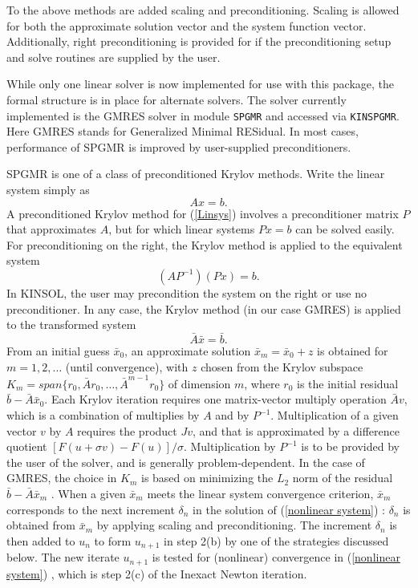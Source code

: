 To the above methods are added scaling and preconditioning. Scaling is allowed
for both the approximate solution vector and the system function vector. 
Additionally, right preconditioning is provided for if the preconditioning 
setup and solve routines are supplied by the user.

While only one linear solver is now implemented for use with this package, the
formal structure is in place for alternate solvers. The solver currently
implemented is the GMRES solver \cite{BrHi89,SaSc86} in module {\tt SPGMR} and
accessed via {\tt KINSPGMR}. Here GMRES stands for Generalized Minimal RESidual.
In most cases, performance of SPGMR is improved by user-supplied 
preconditioners.  

SPGMR is one of a class of preconditioned Krylov methods.  Write the
linear system  simply as
\begin{equation}
 A x = b . \label{Linsys}
\end{equation}
A preconditioned Krylov method for (\ref{Linsys}) involves a
preconditioner matrix $P$ that approximates $A$, but for which
linear systems $Px=b$ can be solved easily.  For preconditioning
on the right, the Krylov method is applied to the equivalent system
\[
 (A P^{-1}) (P x) = b .
\]
In KINSOL, the user may precondition the system on the right or use no 
preconditioner. In any case, the Krylov method (in our case GMRES) is applied to the transformed system
\[
 \bar{A} \bar{x} = \bar{b} .
\]
From an initial guess $\bar{x}_0$, an approximate solution 
$\bar{x}_m = \bar{x}_0 + z$ is obtained for $m = 1, 2, \ldots$ 
(until convergence), with $z$ chosen from the Krylov subspace
$K_m = span\{r_0, \bar{A}r_0, \ldots, \bar{A}^{m-1}r_0\}$ 
of dimension $m$, where $r_0$ is the initial residual 
$\bar{b} - \bar{A} \bar{x}_0$.  Each Krylov iteration requires one
matrix-vector multiply operation $\bar{A} v$, which is a combination
of multiplies by $A$ and by $P^{-1}$.  Multiplication of a given
vector $v$ by $A$ requires the product $Jv$, and that is approximated 
by a difference quotient $[F(u+\sigma v) - F(u)]/\sigma$.
Multiplication by $P^{-1}$ is to be provided by the user of the
solver, and is generally problem-dependent.  In the case of GMRES, 
the choice in $K_m$ is based on minimizing the $L_2$ norm of the
residual $\bar{b} - \bar{A} \bar{x}_m$ \cite{BrHi89,SaSc86}. When a given
$\bar{x}_m$ meets the linear system convergence criterion, $\bar{x}_m$ 
corresponds to the next increment $\delta_n$ in the solution of (\ref{nonlinear
system}) : $\delta_n$ is obtained from $\bar{x}_m$ by applying scaling
and preconditioning. The increment $\delta_n$ is then added to $u_n$ to form 
$u_{n+1}$ in step 2(b) by one of the strategies discussed below. The new
iterate $u_{n+1}$ is tested for (nonlinear) convergence in (\ref{nonlinear 
system}) , which is step 2(c) of the Inexact Newton iteration.


